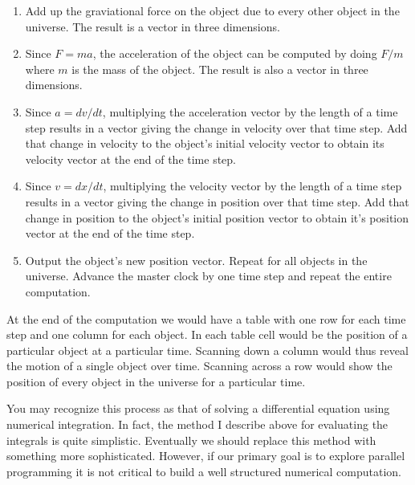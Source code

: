 \begin{enumerate}

\item Add up the graviational force on the object due to every other object in the universe. The
  result is a vector in three dimensions.

\item Since $F = ma$, the acceleration of the object can be computed by doing $F/m$ where $m$ is
  the mass of the object. The result is also a vector in three dimensions.

\item Since $a = dv/dt$, multiplying the acceleration vector by the length of a time step
  results in a vector giving the change in velocity over that time step. Add that change in
  velocity to the object's initial velocity vector to obtain its velocity vector at the end of
  the time step.

\item Since $v = dx/dt$, multiplying the velocity vector by the length of a time step results in
  a vector giving the change in position over that time step. Add that change in position to the
  object's initial position vector to obtain it's position vector at the end of the time step.

\item Output the object's new position vector. Repeat for all objects in the universe. Advance the
  master clock by one time step and repeat the entire computation.

\end{enumerate}

At the end of the computation we would have a table with one row for each time step and one
column for each object. In each table cell would be the position of a particular object at a
particular time. Scanning down a column would thus reveal the motion of a single object over
time. Scanning across a row would show the position of every object in the universe for a
particular time.

You may recognize this process as that of solving a differential equation using numerical
integration. In fact, the method I describe above for evaluating the integrals is quite
simplistic. Eventually we should replace this method with something more sophisticated. However,
if our primary goal is to explore parallel programming it is not critical to build a well
structured numerical computation.
